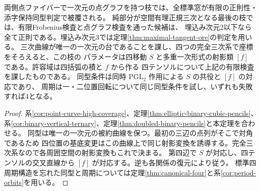 \begin{corollary}\label{cor:all-one-dimensional-point-graphs}
両側点ファイバーで一次元の点グラフを持つ枝では、全標準窓が有限の正則性・添字保持同型判定で被覆される。
純部分が空間有理正規三次となる最後の枝では、有限Frobenius検査と点グラフ検査を通った候補は、
埋込み次元2以下なら全て正則である。埋込み次元3では定理\ref{thm:maximal-tangent-ore}の判定を用いる。
三次曲線が唯一の一次元の台であることを課し、四つの完全三次系で座標をそろえると、この枝の
パラメータは四移動 $S$ と多重一次形式の射影類 $[f]$ である。許容域は四括弧の積と $f$ から作る
四テンソルについて上記の有限検査を課したものである。
同型条件は同時 $\mathrm{PGL}_2$ 作用による $S$ の共役と $[f]$ の対応であり、
周期は一・二位置回転について同じ同型条件を試し、いずれも失敗すれば4となる。
\end{corollary}
\begin{proof}
系\ref{cor:point-curve-high-coverage}、定理\ref{thm:elliptic-binary-cubic-pencils}、
系\ref{cor:binary-vertical-ternary}、定理\ref{thm:doubled-binary-pencils}と本定理を合わせる。
同型は唯一の一次元の被約曲線を保つ。最初の三辺の点列がそこで対角であるため
四位置の基底変更はこの曲線上で同じ射影変換を誘導する。完全三次系なので各周囲空間の射影変換もこれで決まる。
第四辺で $S$ が対応し、四テンソルの交叉直線から $[f]$ が対応する。逆も各関係の復元により従う。
標準四周期構造を忘れた同型と周期については定理\ref{thm:canonical-four}と系\ref{cor:period-orbits}を用いる。
\end{proof}
